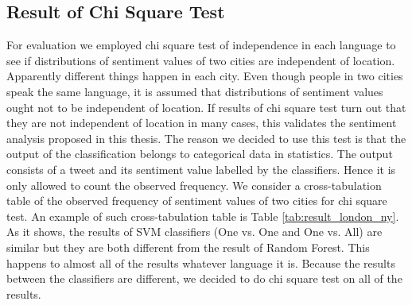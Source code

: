 \subsection{Result of Chi Square Test}\label{sec:result_chi_test}
For evaluation we employed chi square test of independence in each language to see if distributions of sentiment values of two cities are independent of location. 
Apparently different things happen in each city.
Even though people in two cities speak the same language, it is assumed that distributions of sentiment values ought not to be independent of location.  
If results of chi square test turn out that they are not independent of location in many cases, this validates the sentiment analysis proposed in this thesis.
The reason we decided to use this test is that the output of the classification belongs to categorical data in statistics.
The output consists of a tweet and its sentiment value labelled by the classifiers.
Hence it is only allowed to count the observed frequency.
We consider a cross-tabulation table of the observed frequency of sentiment values of two cities for chi square test.
An example of such cross-tabulation table is Table \ref{tab:result_london_ny}.
As it shows, the results of SVM classifiers (One vs. One and One vs. All) are similar but they are both different from the result of Random Forest.
This happens to almost all of the results whatever language it is.
Because the results between the classifiers are different, we decided to do chi square test on all of the results.

